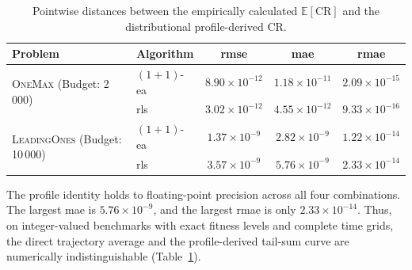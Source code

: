 \begin{table}[!htbp]
  \centering
  \small
  \begin{tabular}{llccc}
    \toprule
    Problem & Algorithm & \acrshort{rmse} & \acrshort{mae} & \acrshort{rmae} \\
    \midrule
    \multirow{2}{8.5em}{\textsc{OneMax} (Budget: 2\,000)}
    & $(1+1)$-\acrshort{ea} & $8.90\times10^{-12}$ &
    $1.18\times10^{-11}$ & $2.09\times10^{-15}$ \\
    & \acrshort{rls}        & $3.02\times10^{-12}$ &
    $4.55\times10^{-12}$ & $9.33\times10^{-16}$ \\
    \midrule
    \multirow{2}{8.5em}{\textsc{LeadingOnes} (Budget: 10\,000)}
    & $(1+1)$-\acrshort{ea} & $1.37\times10^{-9}$ &
    $2.82\times10^{-9}$ & $1.22\times10^{-14}$ \\
    & \acrshort{rls}        & $3.57\times10^{-9}$ &
    $5.76\times10^{-9}$ & $2.33\times10^{-14}$ \\
    \bottomrule
  \end{tabular}
  \caption[Pointwise profile verification distances]{Pointwise
    distances between the empirically calculated $\mathbb{E}[\mathrm{CR}]$
  and the distributional profile-derived $\mathrm{CR}$.}
  \label{tab:profile-verification-distances}
\end{table}
\FloatBarrier

The profile identity holds to floating-point precision across all four
combinations. The largest \acrshort{mae} is $5.76\times10^{-9}$, and the
largest \acrshort{rmae} is only $2.33\times10^{-14}$.
Thus, on integer-valued benchmarks with exact fitness levels and complete time
grids, the direct trajectory average and the profile-derived tail-sum curve are
numerically indistinguishable (Table~\ref{tab:profile-verification-distances}).

